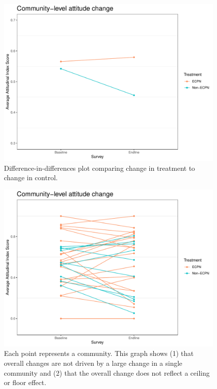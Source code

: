 \documentclass[
]{article}
\begin{document}
\begin{figure}[H]
\centering
\includegraphics[width=\linewidth]{../data_and_code/survey_dat/figs/did_plots/attitudeComm_plot.pdf}
\caption{Difference-in-differences plot comparing change in treatment to change in control.}\label{fig:att_comm}
\end{figure}

\begin{figure}[H]
\centering
\includegraphics[width=\linewidth]{../data_and_code/survey_dat/figs/did_plots/attitudeComm.plot_disag.pdf}
\caption{Each point represents a community. This graph shows (1) that overall changes are not driven by a large change in a single community and (2) that the overall change does not reflect a ceiling or floor effect.}\label{fig:att_comm_dis}
\end{figure}
\end{document}
